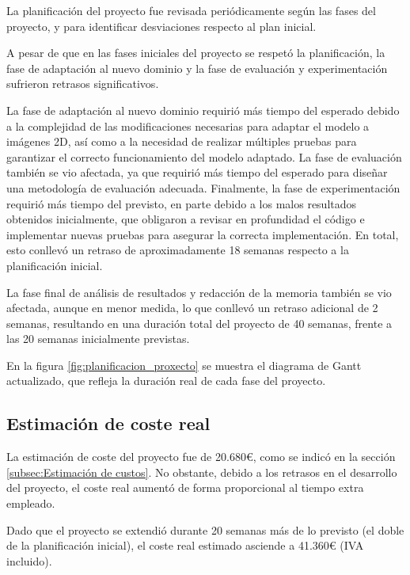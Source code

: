 La planificación del proyecto fue revisada periódicamente según las fases del proyecto, y para identificar desviaciones respecto al plan inicial.

A pesar de que en las fases iniciales del proyecto se respetó la planificación, la fase de adaptación al nuevo dominio y la fase de evaluación y experimentación sufrieron retrasos significativos.

La fase de adaptación al nuevo dominio requirió más tiempo del esperado debido a la complejidad de las modificaciones necesarias para adaptar el modelo a imágenes 2D, así como a la necesidad de realizar múltiples pruebas para garantizar el correcto funcionamiento del modelo adaptado. La fase de evaluación también se vio afectada, ya que requirió más tiempo del esperado para diseñar una metodología de evaluación adecuada. Finalmente, la fase de experimentación requirió más tiempo del previsto, en parte debido a los malos resultados obtenidos inicialmente, que obligaron a revisar en profundidad el código e implementar nuevas pruebas para asegurar la correcta implementación.
En total, esto conllevó un retraso de aproximadamente 18 semanas respecto a la planificación inicial.

La fase final de análisis de resultados y redacción de la memoria también se vio afectada, aunque en menor medida, lo que conllevó un retraso adicional de 2 semanas, resultando en una duración total del proyecto de 40 semanas, frente a las 20 semanas inicialmente previstas.

En la figura \ref{fig:planificacion_proxecto} se muestra el diagrama de Gantt actualizado, que refleja la duración real de cada fase del proyecto.

\subsection{Estimación de coste real}
\label{subsec:Estimación de custo real}

La estimación de coste del proyecto fue de 20.680€, como se indicó en la sección \ref{subsec:Estimación de custos}. No obstante, debido a los retrasos en el desarrollo del proyecto, el coste real aumentó de forma proporcional al tiempo extra empleado.

Dado que el proyecto se extendió durante 20 semanas más de lo previsto (el doble de la planificación inicial), el coste real estimado asciende a 41.360€ (IVA incluido).
